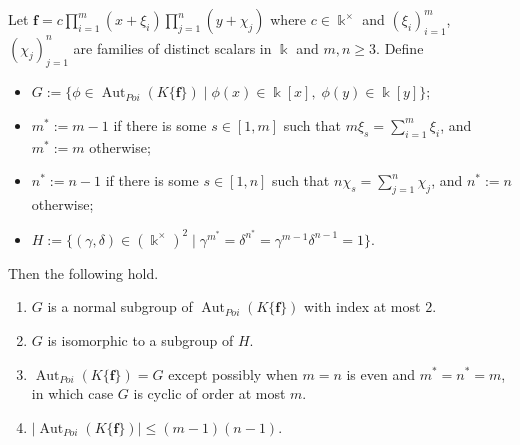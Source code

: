 \documentclass[10pt,a4paper]{amsart}
\DeclareMathOperator{\Aut}{Aut}
\newcommand \bff {{\mathbf{f}}}
\newcommand \kx {\Bbbk^\times}
\begin{document}
\begin{theorem}  \label{zzthm7.5} 
Let  $\bff = c\prod_{i=1}^m (x+\xi_i) \prod_{j=1}^{n} (y+\chi_j)$
where $c \in \kx$ and $(\xi_i)_{i=1}^{m}$, $(\chi_j)_{j=1}^n$ 
are families of distinct scalars in $\Bbbk$ and $m,n \ge 3$.  Define
\begin{itemize}
\item 
$G := \{ \phi \in \Aut_{Poi}(K\{\bff\}) \mid \phi(x) \in \Bbbk[x],\; \phi(y) \in \Bbbk[y] \}$;
\item 
$m^* := m-1$ if there is some $s \in [1,m]$ such that $m \xi_s = \sum_{i=1}^m \xi_i$, and $m^* := m$ otherwise;
\item 
$n^* := n-1$ if there is some $s \in [1,n]$ such that $n \chi_s = \sum_{j=1}^n \chi_j$, and $n^* := n$ otherwise;
\item 
$H := \{ (\gamma,\delta) \in (\kx)^2 \mid \gamma^{m^*} = \delta^{n^*} = \gamma^{m-1} \delta^{n-1} = 1 \}$.
\end{itemize}
Then the following hold.
\begin{enumerate}
\item[(1)] 
$G$ is a normal subgroup of $\Aut_{Poi}(K\{\bff\})$ with index at most $2$.
\item[(2)]
$G$ is isomorphic to a subgroup of $H$.
\item[(3)]
$\Aut_{Poi}(K\{\bff\}) = G$ except possibly when $m=n$ is even and $m^* = n^* = m$, in which case $G$ is cyclic of order at most $m$.
\item[(4)]
$|{\Aut_{Poi}}(K\{\bff\})| \le (m-1)(n-1)$.
\end{enumerate}
\end{theorem}
\end{document}
